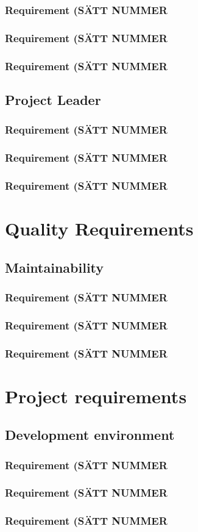 \documentclass{article}
\begin{document}
\subsubsection{Requirement (SÄTT NUMMER}
\subsubsection{Requirement (SÄTT NUMMER}
\subsubsection{Requirement (SÄTT NUMMER} 

\subsection{Project Leader}
\subsubsection{Requirement (SÄTT NUMMER}
\subsubsection{Requirement (SÄTT NUMMER}
\subsubsection{Requirement (SÄTT NUMMER}



\section{Quality Requirements}
\subsection{Maintainability}
\subsubsection{Requirement (SÄTT NUMMER}
\subsubsection{Requirement (SÄTT NUMMER}
\subsubsection{Requirement (SÄTT NUMMER}



\section{Project requirements}
\subsection{Development environment}
\subsubsection{Requirement (SÄTT NUMMER}
\subsubsection{Requirement (SÄTT NUMMER}
\subsubsection{Requirement (SÄTT NUMMER}
\end{document}
